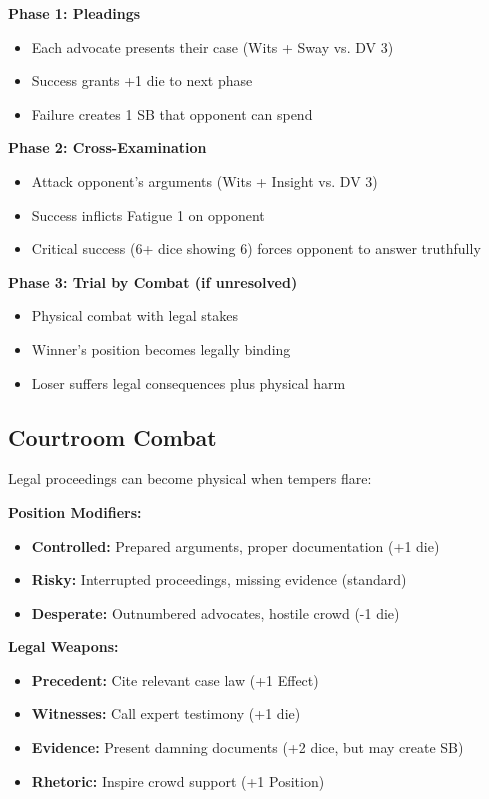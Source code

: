 \textbf{Phase 1: Pleadings}
\begin{itemize}
\item Each advocate presents their case (Wits + Sway vs. DV 3)
\item Success grants +1 die to next phase
\item Failure creates 1 SB that opponent can spend
\end{itemize}

\textbf{Phase 2: Cross-Examination}
\begin{itemize}
\item Attack opponent's arguments (Wits + Insight vs. DV 3)
\item Success inflicts Fatigue 1 on opponent
\item Critical success (6+ dice showing 6) forces opponent to answer truthfully
\end{itemize}

\textbf{Phase 3: Trial by Combat (if unresolved)}
\begin{itemize}
\item Physical combat with legal stakes
\item Winner's position becomes legally binding
\item Loser suffers legal consequences plus physical harm
\end{itemize}

\subsection*{Courtroom Combat}
Legal proceedings can become physical when tempers flare:

\textbf{Position Modifiers:}
\begin{itemize}
\item \textbf{Controlled:} Prepared arguments, proper documentation (+1 die)
\item \textbf{Risky:} Interrupted proceedings, missing evidence (standard)
\item \textbf{Desperate:} Outnumbered advocates, hostile crowd (-1 die)
\end{itemize}

\textbf{Legal Weapons:}
\begin{itemize}
\item \textbf{Precedent:} Cite relevant case law (+1 Effect)
\item \textbf{Witnesses:} Call expert testimony (+1 die)
\item \textbf{Evidence:} Present damning documents (+2 dice, but may create SB)
\item \textbf{Rhetoric:} Inspire crowd support (+1 Position)
\end{itemize}

